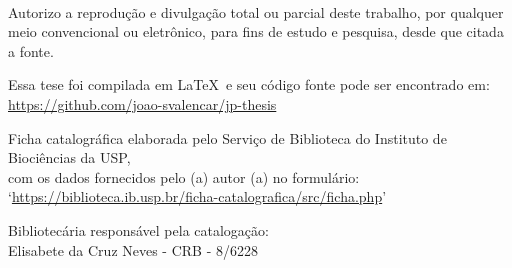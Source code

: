\documentclass[12pt,openright,oneside,a4paper,english]{abntex2}
\renewcommand{\imprimircapa}{%
	\begin{capa}%
		\center
		\ABNTEXchapterfont\Large
		
		\vspace*{1cm}
		
		{\ABNTEXchapterfont\large\imprimirautor}
		
		\vfill
		\begin{center}
			\ABNTEXchapterfont\bfseries\LARGE\imprimirtitulo\\
			\vspace*{2cm}
			\large
			\textit{\imprimirtituloestrangeiro}
		\end{center}
		\vfill
		
		\large\imprimirlocal
		
		\large\imprimirdata
		
		\vspace*{1cm}
	\end{capa}
}
\begin{document}
\imprimircapa
\imprimirfolhaderosto

\begin{fichacatalografica}

\noindent
Autorizo a reprodução e divulgação total ou parcial deste trabalho, por qualquer meio convencional ou eletrônico, para fins de estudo e pesquisa, desde que citada a fonte.\\

\begin{center}
Essa tese foi compilada em \LaTeX\ e seu código fonte pode ser encontrado em:\\
\url{https://github.com/joao-svalencar/jp-thesis}
\end{center}

\sffamily
\vspace*{10cm} %
\begin{center} %

Ficha catalográfica elaborada pelo Serviço de Biblioteca do Instituto de Biociências da USP,\\
com os dados fornecidos pelo (a) autor (a) no formulário:\\
‘\url{https://biblioteca.ib.usp.br/ficha-catalografica/src/ficha.php}’\\
\vspace*{\onelineskip}
\vspace*{\fill}

Bibliotecária responsável pela catalogação:\\
Elisabete da Cruz Neves - CRB - 8/6228
\end{center}
\end{fichacatalografica}
\end{document}
